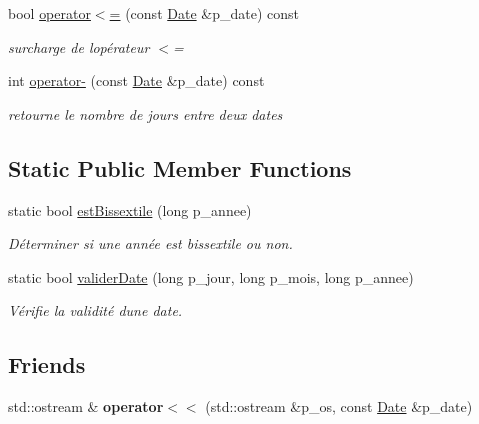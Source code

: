 \begin{DoxyCompactItemize}
bool \hyperlink{classutil_1_1Date_af65a0fddef5326badc11d48d1dd253cd}{operator$<$=} (const \hyperlink{classutil_1_1Date}{Date} \&p\+\_\+date) const
\begin{DoxyCompactList}\small\item\em surcharge de l\textquotesingle{}opérateur $<$= \end{DoxyCompactList}\item 
int \hyperlink{classutil_1_1Date_af12f2c545070b5e2b397be5379c5c3fd}{operator-\/} (const \hyperlink{classutil_1_1Date}{Date} \&p\+\_\+date) const
\begin{DoxyCompactList}\small\item\em retourne le nombre de jours entre deux dates \end{DoxyCompactList}\end{DoxyCompactItemize}
\subsection*{Static Public Member Functions}
\begin{DoxyCompactItemize}
\item 
static bool \hyperlink{classutil_1_1Date_af80efec6a713cdb671d8b23c3e8c4efb}{est\+Bissextile} (long p\+\_\+annee)
\begin{DoxyCompactList}\small\item\em Déterminer si une année est bissextile ou non. \end{DoxyCompactList}\item 
static bool \hyperlink{classutil_1_1Date_af4b4dde01395754245a42483358cb538}{valider\+Date} (long p\+\_\+jour, long p\+\_\+mois, long p\+\_\+annee)
\begin{DoxyCompactList}\small\item\em Vérifie la validité d\textquotesingle{}une date. \end{DoxyCompactList}\end{DoxyCompactItemize}
\subsection*{Friends}
\begin{DoxyCompactItemize}
\item 
\mbox{\label{classutil_1_1Date_ab01372aff5a2aa1d5f5bab251bb7951c}} 
std\+::ostream \& {\bfseries operator$<$$<$} (std\+::ostream \&p\+\_\+os, const \hyperlink{classutil_1_1Date}{Date} \&p\+\_\+date)
\end{DoxyCompactItemize}
